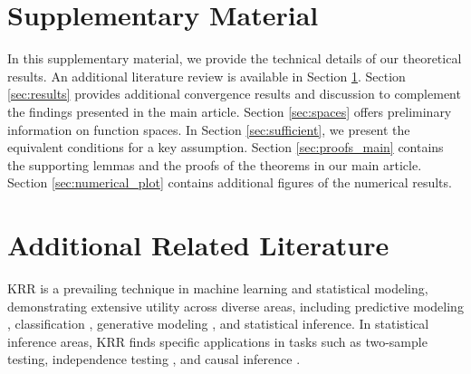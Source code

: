 \documentclass[12pt]{article}
\theoremstyle{plain}
\theoremstyle{remark}
\begin{document}


%


\appendix
\section*{Supplementary Material}

In this supplementary material, we provide the technical details of our theoretical results. An additional literature review is available in Section \ref{sec:literature}. Section \ref{sec:results} provides additional convergence results and discussion to complement the findings presented in the main article. Section \ref{sec:spaces} offers preliminary information on function spaces. In Section \ref{sec:sufficient}, we present the equivalent conditions for a key assumption. Section \ref{sec:proofs_main} contains the supporting lemmas and the proofs of the theorems in our main article. Section \ref{sec:numerical_plot} contains additional figures of the numerical results. 

\section{Additional Related Literature}\label{sec:literature}
KRR is a prevailing technique in machine learning and statistical modeling, demonstrating extensive utility across diverse areas, including predictive modeling \citep{ciliberto2020general,pourkamali2020kernel}, classification \citep{cortes2012algorithms,zien2007multiclass}, generative modeling \citep{dziugaite2015training,li2019implicit}, and statistical inference. In statistical inference areas,  KRR finds specific applications in tasks such as two-sample testing, independence testing \citep{bach2002kernel,gretton2005measuring,gretton2012kernel}, and causal inference \citep{singh2019kernel,singh2020kernel}. 
\end{document}
